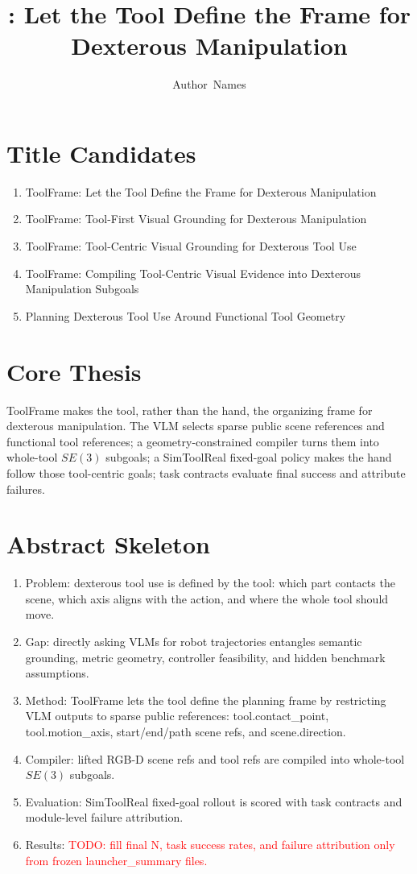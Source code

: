 \documentclass[journal]{IEEEtran}
\title{\method{}: Let the Tool Define the Frame for Dexterous Manipulation}
\author{Author~Names}
\newcommand{\todo}[1]{\textcolor{red}{TODO: #1}}
\newcommand{\method}{ToolFrame}
\begin{document}
\maketitle

\section*{Title Candidates}
\begin{enumerate}
  \item \method{}: Let the Tool Define the Frame for Dexterous Manipulation
  \item \method{}: Tool-First Visual Grounding for Dexterous Manipulation
  \item \method{}: Tool-Centric Visual Grounding for Dexterous Tool Use
  \item \method{}: Compiling Tool-Centric Visual Evidence into Dexterous Manipulation Subgoals
  \item Planning Dexterous Tool Use Around Functional Tool Geometry
\end{enumerate}

\section*{Core Thesis}
\method{} makes the tool, rather than the hand, the organizing frame for
dexterous manipulation. The VLM selects sparse public scene references and
functional tool references; a geometry-constrained compiler turns them into
whole-tool $SE(3)$ subgoals; a SimToolReal fixed-goal policy makes the hand
follow those tool-centric goals; task contracts evaluate final success and
attribute failures.

\section*{Abstract Skeleton}
\begin{enumerate}
  \item Problem: dexterous tool use is defined by the tool: which part contacts
  the scene, which axis aligns with the action, and where the whole tool should
  move.
  \item Gap: directly asking VLMs for robot trajectories entangles semantic
  grounding, metric geometry, controller feasibility, and hidden benchmark
  assumptions.
  \item Method: \method{} lets the tool define the planning frame by restricting
  VLM outputs to sparse public references: tool.contact\_point,
  tool.motion\_axis, start/end/path scene refs, and scene.direction.
  \item Compiler: lifted RGB-D scene refs and tool refs are compiled into
  whole-tool $SE(3)$ subgoals.
  \item Evaluation: SimToolReal fixed-goal rollout is scored with task
  contracts and module-level failure attribution.
  \item Results: \todo{fill final N, task success rates, and failure
  attribution only from frozen launcher\_summary files.}
\end{enumerate}
\end{document}
